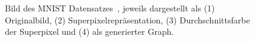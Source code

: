 \begin{figure}[t]
\centering
{}
  \caption[\gls{MNIST}]{Bild des \gls{MNIST} Datensatzes~\cite{mnist}, jeweils dargestellt als (1) Originalbild, (2) Superpixelrepräsentation, (3) Durchschnittsfarbe der Superpixel und (4) als generierter Graph.}
\label{fig:mnist}
\end{figure}

